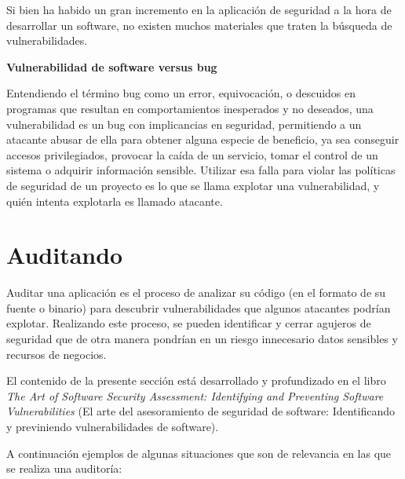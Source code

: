 Si bien ha habido un gran incremento en la aplicación de seguridad a la hora de desarrollar un software, no existen muchos materiales que traten la búsqueda de vulnerabilidades.

\begin{notesBox}
\textbf{Vulnerabilidad de software versus bug}

Entendiendo el término bug como un error, equivocación, o descuidos en programas que resultan en comportamientos inesperados y no deseados, una vulnerabilidad es un bug con implicancias en seguridad, permitiendo a un atacante abusar de ella para obtener alguna especie de beneficio, ya sea conseguir accesos privilegiados, provocar la caída de un servicio, tomar el control de un sistema o adquirir información sensible. Utilizar esa falla para violar las políticas de seguridad de un proyecto es lo que se llama explotar una vulnerabilidad, y quién intenta explotarla es llamado atacante.
\end{notesBox}

\section{Auditando}
Auditar una aplicación es el proceso de analizar su código (en el formato de su fuente o binario) para descubrir vulnerabilidades que algunos atacantes podrían explotar. Realizando este proceso, se pueden identificar y cerrar agujeros de seguridad que de otra manera pondrían en un riesgo innecesario datos sensibles y recursos de negocios.

El contenido de la presente sección está desarrollado y profundizado en el libro \textit{The Art of Software Security Assessment: Identifying and Preventing Software Vulnerabilities}\cite{Dowd:2006:ASS:1196394} (El arte del asesoramiento de seguridad de software: Identificando y previniendo vulnerabilidades de software).

A continuación ejemplos de algunas situaciones que son de relevancia en las que se realiza una auditoría:\newline


